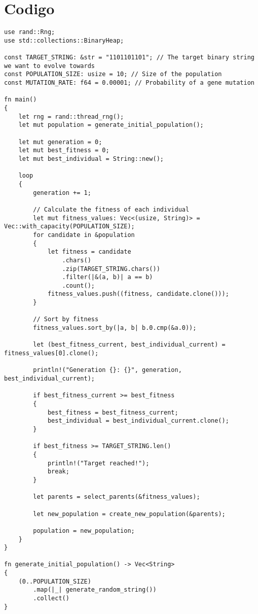 \documentclass{article}
\begin{document}
\section{Codigo}
\begin{verbatim}
use rand::Rng;
use std::collections::BinaryHeap;

const TARGET_STRING: &str = "1101101101"; // The target binary string we want to evolve towards
const POPULATION_SIZE: usize = 10; // Size of the population
const MUTATION_RATE: f64 = 0.00001; // Probability of a gene mutation

fn main()
{
    let rng = rand::thread_rng();
    let mut population = generate_initial_population();

    let mut generation = 0;
    let mut best_fitness = 0;
    let mut best_individual = String::new();

    loop
    {
        generation += 1;

        // Calculate the fitness of each individual
        let mut fitness_values: Vec<(usize, String)> = Vec::with_capacity(POPULATION_SIZE);
        for candidate in &population
        {
            let fitness = candidate
                .chars()
                .zip(TARGET_STRING.chars())
                .filter(|&(a, b)| a == b)
                .count();
            fitness_values.push((fitness, candidate.clone()));
        }

        // Sort by fitness
        fitness_values.sort_by(|a, b| b.0.cmp(&a.0));

        let (best_fitness_current, best_individual_current) = fitness_values[0].clone();

        println!("Generation {}: {}", generation, best_individual_current);

        if best_fitness_current >= best_fitness
        {
            best_fitness = best_fitness_current;
            best_individual = best_individual_current.clone();
        }

        if best_fitness >= TARGET_STRING.len()
        {
            println!("Target reached!");
            break;
        }

        let parents = select_parents(&fitness_values);

        let new_population = create_new_population(&parents);

        population = new_population;
    }
}

fn generate_initial_population() -> Vec<String>
{
    (0..POPULATION_SIZE)
        .map(|_| generate_random_string())
        .collect()
}


\end{verbatim}
\end{document}
